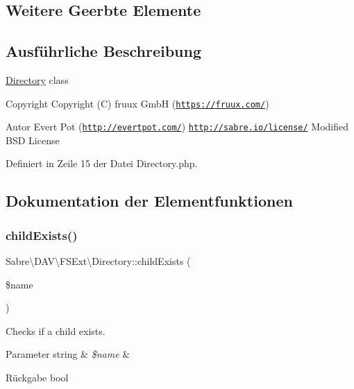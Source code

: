 \subsection*{Weitere Geerbte Elemente}


\subsection{Ausführliche Beschreibung}
\mbox{\hyperlink{class_sabre_1_1_d_a_v_1_1_f_s_ext_1_1_directory}{Directory}} class

\begin{DoxyCopyright}{Copyright}
Copyright (C) fruux GmbH (\href{https://fruux.com/}{\tt https\+://fruux.\+com/}) 
\end{DoxyCopyright}
\begin{DoxyAuthor}{Autor}
Evert Pot (\href{http://evertpot.com/}{\tt http\+://evertpot.\+com/})  \href{http://sabre.io/license/}{\tt http\+://sabre.\+io/license/} Modified B\+SD License 
\end{DoxyAuthor}


Definiert in Zeile 15 der Datei Directory.\+php.



\subsection{Dokumentation der Elementfunktionen}
\mbox{\label{class_sabre_1_1_d_a_v_1_1_f_s_ext_1_1_directory_a7fd5c47b0712920ba3d565f9c878ff46}} 
\subsubsection{\texorpdfstring{child\+Exists()}{childExists()}}
{\footnotesize\ttfamily Sabre\textbackslash{}\+D\+A\+V\textbackslash{}\+F\+S\+Ext\textbackslash{}\+Directory\+::child\+Exists (\begin{DoxyParamCaption}\item[{}]{\$name }\end{DoxyParamCaption})}

Checks if a child exists.


\begin{DoxyParams}[1]{Parameter}
string & {\em \$name} & \\
\hline
\end{DoxyParams}
\begin{DoxyReturn}{Rückgabe}
bool 
\end{DoxyReturn}


